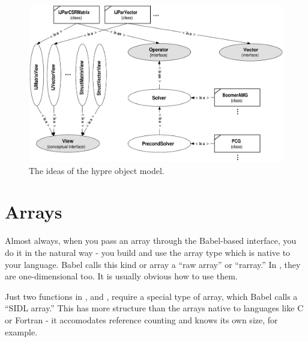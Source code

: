 \begin{figure}
\centering
\includegraphics[width=5in]{figObjectModel}
\caption{%
The ideas of the hypre object model.}
\label{figObjectModel}
\end{figure}





\section{Arrays}
Almost always, when you pass an array through the Babel-based
interface, you do it in the natural way - you build and use the array
type which is native to your language.  Babel calls this kind or array
a ``raw array'' or ``rarray.''  In \hypre{}, they are
one-dimensional too.  It is usually obvious how to use them.

Just two functions in \hypre{},  and
, require a special type of array, which Babel
calls a ``SIDL array.''  This has more structure than the arrays
native to languages like C or Fortran - it accomodates reference
counting and knows its own size, for example.

